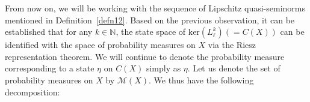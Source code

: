 \documentclass[a4paper,11pt,reqno]{amsart}
\theoremstyle{plain}
\theoremstyle{named}
\numberwithin{equation}{section}
\newcommand{\Bea}{\begin{eqnarray*}}
\newcommand{\Eea}{\end{eqnarray*}}
\begin{document}
				
				
				
				
			
			From now on, we will be working with the sequence of Lipschitz quasi-seminorms mentioned in Definition~\ref{defn12}.
			Based on the previous observation, it can be established that for any \( k \in \mathbb{N}\), the state space of \( \text{ker}(L_{\ell}^{k}) (= C(X)) \) can be identified with the space of probability measures on \( X \) via the Riesz representation theorem. We will continue to denote the probability measure corresponding to a state \( \eta\) on \(C(X)\) simply as \(\eta\). Let us denote the set of probability measures on \( X \) by \( \mathcal{M}(X) \). We thus have the following decomposition:
			
\end{document}
